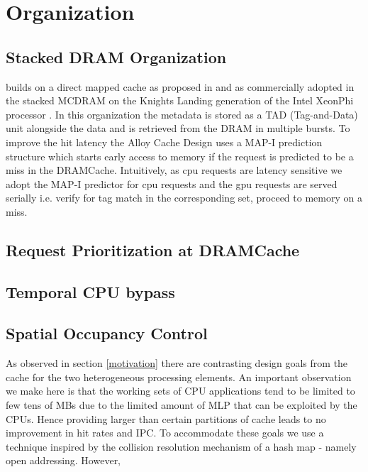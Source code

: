\section{\cachename Organization} \label{mechanism}
\subsection{Stacked DRAM Organization} \label{rbhvblp}
\cachename builds on a direct mapped cache as proposed in \cite{alloy} and as commercially adopted in the stacked MCDRAM on the Knights Landing generation of the Intel XeonPhi processor \cite{xeonphi}. In this organization the metadata is stored as a TAD (Tag-and-Data) unit alongside the data and is retrieved from the DRAM in multiple bursts. To improve the hit latency the Alloy Cache Design uses a MAP-I prediction structure which starts early access to memory if the request is predicted to be a miss in the DRAMCache. Intuitively, as cpu requests are latency sensitive we adopt the MAP-I predictor for cpu requests and the gpu requests are served serially i.e. verify for tag match in the corresponding set, proceed to memory on a miss.
\subsection{Request Prioritization at DRAMCache}
\subsection{Temporal CPU bypass}
\subsection{Spatial Occupancy Control}
As observed in section \ref{motivation} there are contrasting design goals from the cache for the two heterogeneous processing elements. An important observation we make here is that the working sets of CPU applications tend to be limited to few tens of MBs due to the limited amount of MLP that can be exploited by the CPUs. Hence providing larger than certain partitions of cache leads to no improvement in hit rates and IPC. To accommodate these goals we use a technique inspired by the collision resolution mechanism of a hash map - namely open addressing. However, 